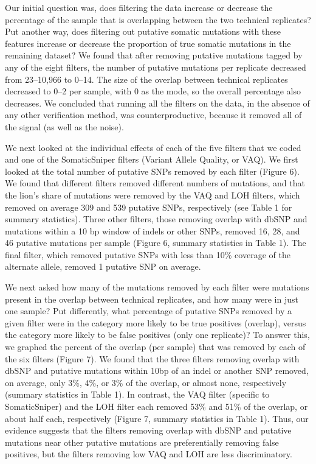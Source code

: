 \documentclass[11pt]{article} %
\begin{document}
Our initial question was, does filtering the data increase or decrease the percentage of the sample that is overlapping between the two technical replicates? Put another way, does filtering out putative somatic mutations with these features increase or decrease the proportion of true somatic mutations in the remaining dataset? We found that after removing putative mutations tagged by any of the eight filters, the number of putative mutations per replicate decreased from 23--10,966 to 0--14. The size of the overlap between technical replicates decreased to 0--2 per sample, with 0 as the mode, so the overall percentage also decreases. We concluded that running all the filters on the data, in the absence of any other verification method, was counterproductive, because it removed all of the signal (as well as the noise). 

We next looked at the individual effects of each of the five filters that we coded and one of the SomaticSniper filters (Variant Allele Quality, or VAQ). We first looked at the total number of putative SNPs removed by each filter (Figure 6). We found that different filters removed different numbers of mutations, and that the lion's share of mutations were removed by the VAQ and LOH filters, which removed on average 309 and 539 putative SNPs, respectively (see Table 1 for summary statistics). Three other filters, those removing overlap with dbSNP and mutations within a 10 bp window of indels or other SNPs, removed 16, 28, and 46 putative mutations per sample (Figure 6, summary statistics in Table 1). The final filter, which removed putative SNPs with less than 10\% coverage of the alternate allele, removed 1 putative SNP on average. 

We next asked how many of the mutations removed by each filter were mutations present in the overlap between technical replicates, and how many were in just one sample? Put differently, what percentage of putative SNPs removed by a given filter were in the category more likely to be true positives (overlap), versus the category more likely to be false positives (only one replicate)? To answer this, we graphed the percent of the overlap (per sample) that was removed by each of the six filters (Figure 7). We found that the three filters removing overlap with dbSNP and putative mutations within 10bp of an indel or another SNP removed, on average, only 3\%, 4\%, or 3\% of the overlap, or almost none, respectively (summary statistics in Table 1). In contrast, the VAQ filter (specific to SomaticSniper) and the LOH filter each removed 53\% and 51\% of the overlap, or about half each, respectively (Figure 7, summary statistics in Table 1). Thus, our evidence suggests that the filters removing overlap with dbSNP and putative mutations near other putative mutations are preferentially removing false positives, but the filters removing low VAQ and LOH are less discriminatory. 
\end{document}
